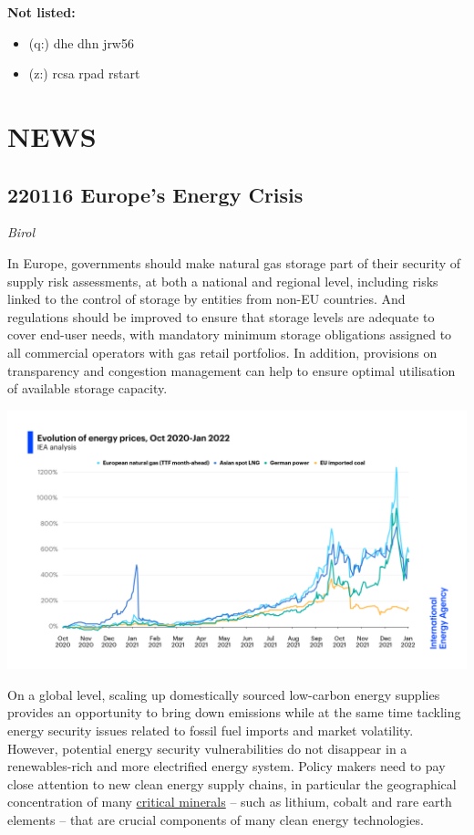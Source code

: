 \documentclass[
]{book}
\providecommand{\tightlist}{%
  \setlength{\itemsep}{0pt}\setlength{\parskip}{0pt}}
\begin{document}
\textbf{Not listed:}

\begin{itemize}
\tightlist
\item
  (q:) dhe dhn jrw56
\item
  (z:) rcsa rpad rstart
\end{itemize}

\hypertarget{news}{%
\chapter{NEWS}\label{news}}

\hypertarget{europes-energy-crisis}{%
\section{220116 Europe's Energy Crisis}\label{europes-energy-crisis}}

\emph{Birol}

In Europe, governments should make natural gas storage part of their security of supply risk assessments, at both a national and regional level, including risks linked to the control of storage by entities from non-EU countries. And regulations should be improved to ensure that storage levels are adequate to cover end-user needs, with mandatory minimum storage obligations assigned to all commercial operators with gas retail portfolios. In addition, provisions on transparency and congestion management can help to ensure optimal utilisation of available storage capacity.

\includegraphics{fig/Energy_Prices_Oct2020-jan2022_IEA.png}

On a global level, scaling up domestically sourced low-carbon energy supplies provides an opportunity to bring down emissions while at the same time tackling energy security issues related to fossil fuel imports and market volatility. However, potential energy security vulnerabilities do not disappear in a renewables-rich and more electrified energy system. Policy makers need to pay close attention to new clean energy supply chains, in particular the geographical concentration of many \href{https://www.iea.org/reports/the-role-of-critical-minerals-in-clean-energy-transitions}{critical minerals} -- such as lithium, cobalt and rare earth elements -- that are crucial components of many clean energy technologies.
\end{document}
